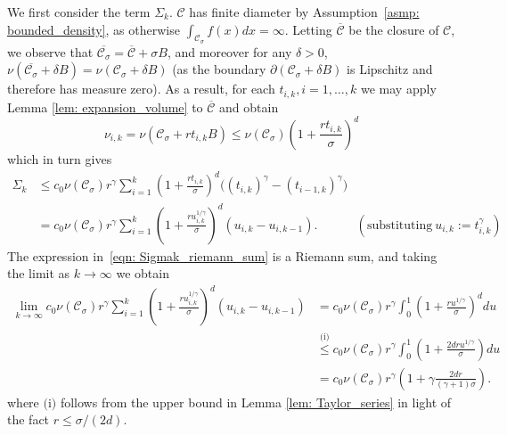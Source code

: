 \documentclass[11pt,twoside]{article}
\newcommand{\1}{\mathbbm{1}}
\newcommand{\Cset}{\mathcal{C}}
\newcommand{\Csig}{\Cset_{\sigma}}
\begin{document}
	We first consider the term $\Sigma_k$. $\Cset$ has finite diameter by Assumption~\ref{asmp: bounded_density}, as otherwise $\int_{\Csig} f(x) dx = \infty$. Letting $\overline{\Cset}$ be the closure of $\Cset$, we observe that $\overline{\Csig} = \overline{\Cset} + \sigma B$, and moreover for any $\delta > 0$, $\nu(\overline{\Csig} + \delta B) = \nu(\Csig + \delta B)$ (as the boundary $\partial(\Csig + \delta B)$ is Lipschitz and therefore has measure zero). As a result, for each $t_{i,k}, i = 1, \ldots,k$ we may apply Lemma \ref{lem: expansion_volume} to $\overline{\Cset}$ and obtain
	\begin{equation}
	\label{eqn: slice_volume_bound}
	\nu_{i,k} = \nu(\Csig + rt_{i,k}B) \leq \nu(\Csig)\left(1 + \frac{rt_{i,k}}{\sigma}\right)^d
	\end{equation}
	which in turn gives
	\begin{align}
	\Sigma_k & \leq c_0\nu(\Csig) r^\gamma \sum_{i = 1}^{k} \left(1 + \frac{ rt_{i,k}}{\sigma}\right)^d \biggl( (t_{i,k})^{\gamma} - (t_{i-1,k})^{\gamma}\biggr) \nonumber \\
	& = c_0\nu(\Csig) r^\gamma \sum_{i = 1}^{k} \left(1 + \frac{ru_{i,k}^{1/\gamma}}{\sigma}\right)^d ( u_{i,k} - u_{i,k-1}).~~~~~~~~~~~~~~ (\text{substituting}~u_{i,k} := t_{i,k}^{\gamma}) \label{eqn: Sigmak_riemann_sum}
	\end{align}
	The expression in~\eqref{eqn: Sigmak_riemann_sum} is a Riemann sum, and taking the limit as $k \to \infty$ we obtain
	\begin{align}
	\lim_{k \to \infty} c_0\nu(\Csig) r^\gamma \sum_{i = 1}^{k} \left(1 + \frac{ru_{i,k}^{1/\gamma}}{\sigma}\right)^d ( u_{i,k} - u_{i,k-1}) & = c_0\nu(\Csig) r^\gamma \int_{0}^{1} \left(1 + \frac{r u^{1/\gamma}}{\sigma}\right)^{d} du \nonumber \\
	& \overset{\text{(i)}}{\leq} c_0\nu(\Csig) r^\gamma \int_{0}^{1} \left(1 + \frac{2 d r u^{1/\gamma}}{\sigma}\right) du \nonumber \\
	& = c_0\nu(\Csig) r^\gamma \left(1 + \gamma \frac{2 d r}{(\gamma + 1)\sigma}\right). \label{eqn: Sigmak_integral}
	\end{align}
	where $\text{(i)}$ follows from the upper bound in Lemma \ref{lem: Taylor_series} in light of the fact $r \leq \sigma/(2d)$. 
	
\end{document}

